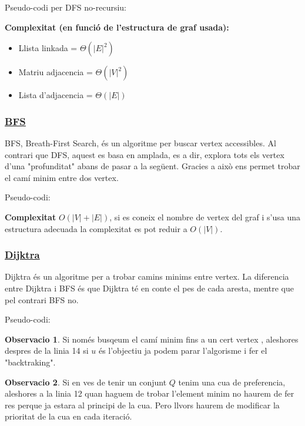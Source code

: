 \documentclass[12pt]{article}
\theoremstyle{definition}
\theoremstyle{definition}
\theoremstyle{definition}
\newtheorem{obs}{Observacio}
\theoremstyle{definition}
\theoremstyle{definition}
\theoremstyle{definition}
\theoremstyle{definition}
\begin{document}
\newpage

Pseudo-codi per DFS no-recursiu:


\textbf{Complexitat (en funció de l'estructura de graf usada):}
\begin{itemize}
	\item Llista linkada = $\Theta(|E|^2)$
	\item Matriu adjacencia = $\Theta(|V|^2)$
	\item Lista d'adjacencia = $\Theta(|E|)$
\end{itemize}

\subsubsection{\href{https://en.wikipedia.org/wiki/Breadth-first_search}{\color{blue}\underline{BFS}}}
BFS, Breath-First Search, és un algoritme per buscar vertex accessibles.
Al contrari que DFS, aquest es basa en amplada, es a dir, explora tots els vertex d'una "profunditat" abans de pasar a la següent.
Gracies a això ens permet trobar el camí minim entre dos vertex.

Pseudo-codi:


\textbf{Complexitat} $O(|V|+|E|)$, si es coneix el nombre de vertex del graf i s'usa una estructura adecuada la complexitat es pot reduir a $O(|V|)$.

\newpage

\subsubsection{\href{http://tiny.cc/6dd7fz}{\color{blue}\underline{Dijktra}}}
Dijktra és un algoritme per a trobar camins minims entre vertex.
La diferencia entre Dijktra i BFS és que Dijktra té en conte el pes de cada aresta, mentre que pel contrari BFS no.

Pseudo-codi:


\begin{obs}
Si només busqeum el camí minim fins a un cert vertex , aleshores despres de la linia 14 si $u$ és l'objectiu ja podem parar l'algorisme i fer el "backtraking".
\end{obs}

\begin{obs}
Si en ves de tenir un conjunt $Q$ tenim una cua de preferencia, aleshores a la linia 12 quan haguem de trobar l'element minim no haurem de fer res perque ja estara al principi de la cua. Pero llvors haurem de modificar la prioritat de la cua en cada iteració.
\end{obs}
\end{document}
